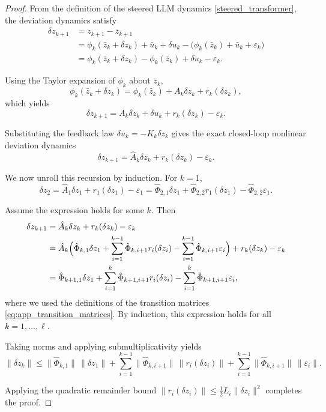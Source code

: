 \documentclass{article}
\theoremstyle{plain}
\theoremstyle{definition}
\theoremstyle{remark}
\begin{document}
\begin{proof}
From the definition of the steered LLM dynamics \eqref{steered_transformer}, the deviation dynamics
satisfy
\begin{align*}
\delta z_{k+1}
&= z_{k+1} - \bar z_{k+1} \\
&= \phi_k(\bar z_k + \delta z_k) + \bar u_k + \delta u_k
   - \bigl(\phi_k(\bar z_k) + \bar u_k + \varepsilon_k\bigr) \\
&= \phi_k(\bar z_k + \delta z_k) - \phi_k(\bar z_k)
   + \delta u_k - \varepsilon_k .
\end{align*}

Using the Taylor expansion of $\phi_k$ about $\bar z_k$,
\[
\phi_k(\bar z_k + \delta z_k)
= \phi_k(\bar z_k) + A_k \delta z_k + r_k(\delta z_k),
\]
which yields
\[
\delta z_{k+1}
= A_k \delta z_k + \delta u_k + r_k(\delta z_k) - \varepsilon_k .
\]

Substituting the feedback law $\delta u_k = -K_k \delta z_k$ gives the exact
closed-loop nonlinear deviation dynamics
\[
\delta z_{k+1}
= \hat A_k \delta z_k + r_k(\delta z_k) - \varepsilon_k .
\]

We now unroll this recursion by induction. For $k=1$,
\[
\delta z_2
= \hat A_1 \delta z_1 + r_1(\delta z_1) - \varepsilon_1
= \hat\Phi_{2,1}\delta z_1
  + \hat\Phi_{2,2} r_1(\delta z_1)
  - \hat\Phi_{2,2} \varepsilon_1 .
\]

Assume the expression holds for some $k$. Then
\begin{align*}
\delta z_{k+1}
&= \hat A_k \delta z_k + r_k(\delta z_k) - \varepsilon_k \\
&= \hat A_k \Bigl(
      \hat\Phi_{k,1} \delta z_1
      + \sum_{i=1}^{k-1} \hat\Phi_{k,i+1} r_i(\delta z_i)
      - \sum_{i=1}^{k-1} \hat\Phi_{k,i+1} \varepsilon_i
    \Bigr)
    + r_k(\delta z_k) - \varepsilon_k \\
&= \hat\Phi_{k+1,1} \delta z_1
  + \sum_{i=1}^{k} \hat\Phi_{k+1,i+1} r_i(\delta z_i)
  - \sum_{i=1}^{k} \hat\Phi_{k+1,i+1} \varepsilon_i ,
\end{align*}
where we used the definitions of the transition matrices
\eqref{eq:app_transition_matrices}. By induction, this expression holds for all
$k = 1,\ldots,\ell$.

Taking norms and applying submultiplicativity yields
\[
\|\delta z_k\|
\le
\|\hat\Phi_{k,1}\|\,\|\delta z_1\|
+ \sum_{i=1}^{k-1} \|\hat\Phi_{k,i+1}\|\,\|r_i(\delta z_i)\|
+ \sum_{i=1}^{k-1} \|\hat\Phi_{k,i+1}\|\,\|\varepsilon_i\| .
\]

Applying the quadratic remainder bound
$\|r_i(\delta z_i)\| \le \tfrac12 L_i \|\delta z_i\|^2$ completes the proof.
\end{proof}
\end{document}
